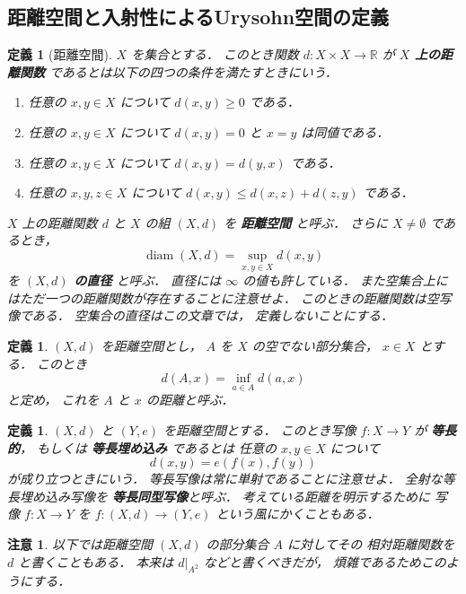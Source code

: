\documentclass[leqno, 12pt]{jsarticle}
\newtheorem{df}[thm]{定義}
\newtheorem*{rmk}{注意}
\newcommand{\rr}{\mathbb{R}}
\DeclareMathOperator{\di}{diam}
\newcommand{\SetPointDist}[3]{#1(#2,#3)}
\newcommand{\restr}[2]{#1|_{#2}}
\begin{document}
\subsection{距離空間と入射性によるUrysohn空間の定義}\label{subsec:intro:definition}
\begin{df}[距離空間]\label{df:intro:metric}
$X$
を集合とする．
このとき関数
$d\colon  X\times X\to \rr$
が
\textbf{%
$X$%
上の距離関数}
であるとは以下の四つの条件を満たすときにいう．
\begin{enumerate}[label=\textup{(\arabic*)}]
\item
任意の
$x, y\in X$
について
$d(x, y)\ge 0$
である．
\item
任意の
$x, y\in X$
について
$d(x, y)=0$
と
$x=y$
は同値である．
\item
任意の
$x, y\in X$
について
$d(x, y)=d(y, x)$
である．
\item
任意の
$x, y, z\in X$
について
$d(x, y)\le d(x, z)+d(z, y)$
である．
\end{enumerate}
$X$
上の距離関数
$d$
と
$X$
の組
$(X, d)$
を
\textbf{距離空間}
と呼ぶ．
さらに
$X\neq\emptyset$
であるとき，
\[
\di(X, d)=\sup_{x, y\in X}d(x, y)
\]
を
\textbf{%
$(X, d)$%
の直径}
と呼ぶ．
直径には
$\infty$
の値も許している．
また空集合上にはただ一つの距離関数が存在することに注意せよ．
このときの距離関数は空写像である．
空集合の直径はこの文章では，%
定義しないことにする．
\end{df}

\begin{df}\label{df:intro:set-point-distance}
$(X,d)$
を距離空間とし，
$A$
を
$X$
の空でない部分集合，
$x\in X$
とする．
このとき
\[
\SetPointDist{d}{A}{x}
=\inf_{a\in A}d(a,x)
\]
と定め，
これを
$A$
と
$x$
の距離と呼ぶ．
\end{df}

\begin{df}\label{df:intro:iso}
$(X, d)$
と
$(Y, e)$
を距離空間とする．
このとき写像
$f: X\to Y$
が
\textbf{等長的}，
もしくは
\textbf{等長埋め込み}
であるとは
任意の
$x, y\in X$
について
\[
d(x, y)=e(f(x), f(y))
\]
が成り立つときにいう．
等長写像は常に単射であることに注意せよ．
全射な等長埋め込み写像を
\textbf{等長同型写像}と呼ぶ．
考えている距離を明示するために
写像
$f\colon
 X\to Y$
 を
 $f\colon   (X, d)\to (Y, e)$
という風にかくこともある．
\end{df}



\begin{rmk}\label{rmk:notation:restricted-metric}
以下では距離空間
$(X, d)$
の部分集合
$A$
に対してその
相対距離関数を
$d$
と書くこともある．
本来は
$\restr{d}{A^2}$
などと書くべきだが，%
煩雑であるためこのようにする．
\end{rmk}
\end{document}
